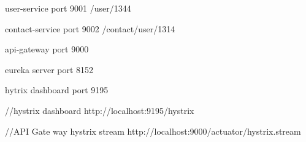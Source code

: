 user-service
			port 9001
			/user/1344
			
 contact-service
            port 9002
			/contact/user/1314
			
 api-gateway 
          port 9000
		  
 eureka server
          port 8152

 hytrix dashboard
          port 9195
		  
 //hystrix dashboard 		  
 http://localhost:9195/hystrix
 
 
 //API Gate way hystrix stream
 http://localhost:9000/actuator/hystrix.stream